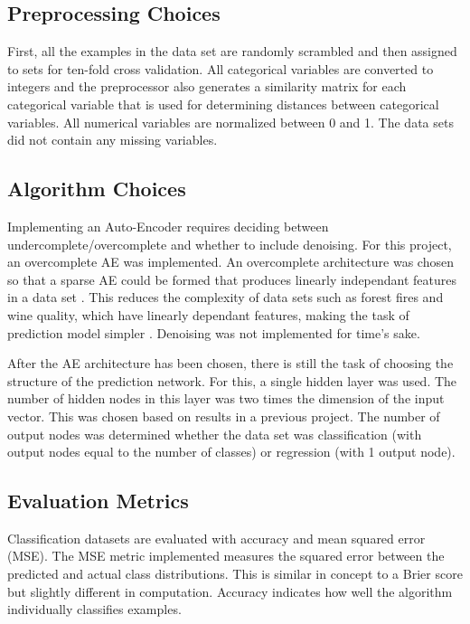 \documentclass[twoside,11pt]{article}
\begin{document}
\subsection{Preprocessing Choices}

	First, all the examples in the data set are randomly scrambled and then assigned to sets for ten-fold cross validation. 
	All categorical variables are converted to integers 
	and the preprocessor also generates a similarity matrix for each categorical variable that is used for determining distances between categorical variables. 
	All numerical variables are normalized between 0 and 1. 
	The data sets did not contain any missing variables.

\subsection{Algorithm Choices}
	
	Implementing an Auto-Encoder requires deciding between undercomplete/overcomplete and whether to include denoising.
	For this project, an overcomplete AE was implemented. An overcomplete architecture was chosen so that a sparse AE could be formed that produces linearly independant features in a data set \citep{sparsity}. 
	This reduces the complexity of data sets such as forest fires and wine quality, which have linearly dependant features, making the task of prediction model simpler \citep{datasets}.
	Denoising was not implemented for time's sake.
	
	After the AE architecture has been chosen, there is still the task of choosing the structure of the prediction network.
	For this, a single hidden layer was used. 
	The number of hidden nodes in this layer was two times the dimension of the input vector. This was chosen based on results in a previous project. 
	The number of output nodes was determined whether the data set was classification (with output nodes equal to the number of classes) or regression (with 1 output node).

\subsection{Evaluation Metrics}

	Classification datasets are evaluated with accuracy and mean squared error (MSE). 
	The MSE metric implemented measures the squared error between the predicted and actual class distributions. 
	This is similar in concept to a Brier score but slightly different in computation. Accuracy indicates how well the algorithm individually classifies examples.
	
\end{document}
